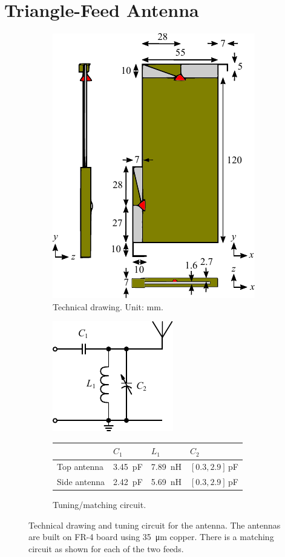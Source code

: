 \section{Triangle-Feed Antenna}
\label{sec:techsol_triang}

\begin{figure}[htbp]
    \begin{subfigure}[b]{0.49\linewidth}
        \centering
        \includegraphics{img/tech_sol/trianglefeed/technical}
        \caption{Technical drawing. Unit: mm.}
        \label{fig:ant2technical}
    \end{subfigure}
    \hfill
    \begin{subfigure}[b]{0.49\linewidth}
        \centering
        \includegraphics{img/tech_sol/schematic_tuning_1}\\[1cm]
        \footnotesize
        \begin{tabular}{|l|l|l|l|}
            \hline
            & $C_1$ & $L_1$ & $C_2$ \\
            \hline
            Top antenna & \SI{3.45}{pF} & \SI{7.89}{nH} & $[0.3,2.9]\,$pF\\
            Side antenna & \SI{2.42}{pF} & \SI{5.69}{nH} & $[0.3,2.9]\,$pF\\
            \hline
        \end{tabular}
        \caption{Tuning/matching circuit.}
        \label{fig:ant2schematic}
    \end{subfigure}
    \caption{Technical drawing and tuning circuit for the antenna.  The antennas are built on FR-4 board using \SI{35}{\micro\meter} copper. There is a matching circuit as shown for each of the two feeds.}
    \label{fig:ant2techschem}
\end{figure}

